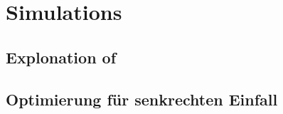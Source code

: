 \chapter{Simulations }
\label{ch:Simulation}

\section{Explonation of }

\section{Optimierung für senkrechten Einfall}